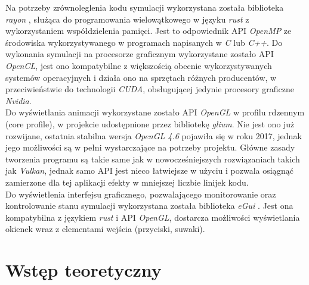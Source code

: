 \documentclass[12pt, letterpaper]{report}
\begin{document}
    Na potrzeby zrównoleglenia kodu symulacji wykorzystana została biblioteka \emph{rayon} \cite{rayon}, służąca
    do programowania wielowątkowego w języku \emph{rust} z wykorzystaniem współdzielenia pamięci. 
    Jest to odpowiednik API \emph{OpenMP} ze środowiska wykorzystywanego w 
    programach napisanych w \emph{C} lub \emph{C++}. 
    Do wykonania symulacji na procesorze graficznym wykorzystane zostało API \emph{OpenCL}, jest ono kompatybilne
    z większością obecnie wykorzystywanych systemów operacyjnych i działa ono na sprzętach różnych producentów, 
    w przeciwieństwie do technologii \emph{CUDA}, obsługującej jedynie procesory graficzne \emph{Nvidia}. \\
    
    Do wyświetlania animacji wykorzystane zostało API \emph{\emph{OpenGL}} w profilu rdzennym (core profile), w projekcie
    udostępnione przez bibliotekę \emph{glium}. Nie jest ono już rozwijane, ostatnia stabilna wersja 
    \emph{\emph{OpenGL} 4.6} pojawiła się w roku 2017, jednak jego możliwości są w pełni wystarczające
    na potrzeby projektu. Główne zasady tworzenia programu są takie same jak w nowocześniejszych rozwiązaniach 
    takich jak \emph{Vulkan}, jednak samo API jest nieco łatwiejsze w użyciu i pozwala osiągnąć zamierzone 
    dla tej aplikacji efekty w mniejszej liczbie linijek kodu. \\

    Do wyświetlenia interfejsu graficznego, pozwalającego monitorowanie oraz kontrolowanie stanu symulacji  
    wykorzystana została biblioteka \emph{eGui} \cite{egui}. Jest ona kompatybilna z językiem \emph{rust} 
    i API \emph{\emph{OpenGL}}, dostarcza możliwości wyświetlania okienek wraz z elementami wejścia (przyciski, suwaki). \\

    
\chapter{Wstęp teoretyczny}
\end{document}
